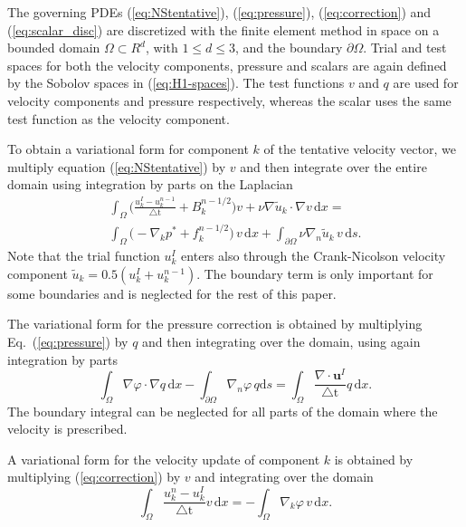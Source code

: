 \documentclass[final,3p,times,twocolumn]{elsarticle}
\newcounter{bla}
\begin{document}
The governing PDEs (\ref{eq:NStentative}), (\ref{eq:pressure}), (\ref{eq:correction}) and (\ref{eq:scalar_disc}) are discretized with the finite element method in space on a bounded domain $\Omega \subset R^d$, with $1 \leq d \leq 3$, and the boundary $\partial \Omega$. Trial and test spaces for both the velocity components, pressure and scalars are again defined by the Sobolov spaces in (\ref{eq:H1-spaces}). The test functions $v$ and $q$ are used for velocity components and pressure respectively, whereas the scalar uses the same test function as the velocity component. 

To obtain a variational form for component $k$ of the tentative velocity vector, we multiply equation (\ref{eq:NStentative}) by $v$ and then integrate over the entire domain using integration by parts on the Laplacian
\begin{multline}
\int_{\Omega} \Big ( \frac{u_k^{I} - u_k^{n-1}}{\triangle \text{t}} + B_k^{n-1/2} \Big) v + \nu \nabla \tilde{u}_k \cdot \nabla v \, \mathrm{d}x = \\
\int_{\Omega} \Big (- \nabla_k p^{*} + f_k^{n-1/2} \Big) \, v \, \mathrm{d}x + \int_{\partial \Omega} \nu \nabla_n \tilde{u}_k \, v\, \mathrm{d}s .  \label{eq:NStentativeFEM} 
\end{multline}
Note that the trial function $u_k^{I}$ enters also through the Crank-Nicolson velocity component $\tilde{u}_k = 0.5(u_k^{I}+u_k^{n-1})$. The boundary term is only important for some boundaries and is neglected for the rest of this paper.

The variational form for the pressure correction is obtained by multiplying Eq.~(\ref{eq:pressure})  by $q$ and then integrating over the domain, using again integration by parts
\begin{equation}
\int_{\Omega} \nabla \varphi \cdot \nabla q \, \mathrm{d}x - \int_{\partial \Omega} \nabla_n \varphi \, q \mathrm{d}s = \int_{\Omega} \frac{\nabla \cdot \bm{u}^I}{\triangle \text{t}} q \, \mathrm{d}x.  \label{eq:pressureVF} 
\end{equation}
The boundary integral can be neglected for all parts of the domain where the velocity is prescribed.

A variational form for the velocity update of component $k$ is obtained by multiplying (\ref{eq:correction}) by $v$ and integrating over the domain
\begin{equation}
 \int_{\Omega} \frac{u_k^n - {u}_k^{I}}{\triangle \text{t}} v \, \mathrm{d}x =  - \int_{\Omega} \nabla_k \varphi \, v \,\mathrm{d}x. \label{eq:correction_i_VF}
\end{equation}
\end{document}
